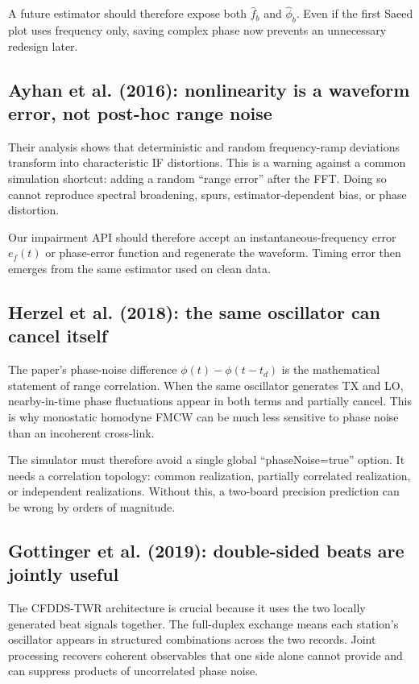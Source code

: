 \documentclass[11pt]{article}
\begin{document}
A future estimator should therefore expose both $\hat f_b$ and $\hat\phi_b$. Even if the first Saeed plot uses frequency only, saving complex phase now prevents an unnecessary redesign later.

\subsection{Ayhan et al. (2016): nonlinearity is a waveform error, not post-hoc range noise}
Their analysis shows that deterministic and random frequency-ramp deviations transform into characteristic IF distortions. This is a warning against a common simulation shortcut: adding a random ``range error'' after the FFT. Doing so cannot reproduce spectral broadening, spurs, estimator-dependent bias, or phase distortion.

Our impairment API should therefore accept an instantaneous-frequency error $e_f(t)$ or phase-error function and regenerate the waveform. Timing error then emerges from the same estimator used on clean data.

\subsection{Herzel et al. (2018): the same oscillator can cancel itself}
The paper's phase-noise difference $\phi(t)-\phi(t-t_d)$ is the mathematical statement of range correlation. When the same oscillator generates TX and LO, nearby-in-time phase fluctuations appear in both terms and partially cancel. This is why monostatic homodyne FMCW can be much less sensitive to phase noise than an incoherent cross-link.

The simulator must therefore avoid a single global ``phaseNoise=true'' option. It needs a correlation topology: common realization, partially correlated realization, or independent realizations. Without this, a two-board precision prediction can be wrong by orders of magnitude.

\subsection{Gottinger et al. (2019): double-sided beats are jointly useful}
The CFDDS-TWR architecture is crucial because it uses the two locally generated beat signals together. The full-duplex exchange means each station's oscillator appears in structured combinations across the two records. Joint processing recovers coherent observables that one side alone cannot provide and can suppress products of uncorrelated phase noise.
\end{document}
